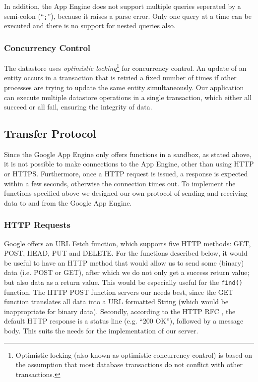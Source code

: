 In addition, the App Engine does not support multiple queries seperated by a
semi-colon (``\texttt{;}''), because it raises a parse error. Only one query at
a time can be executed and there is no support for nested queries also.

\subsubsection{Concurrency Control}
\label{serverdesign-transactions}
The datastore uses \emph{optimistic locking}\footnote{Optimistic locking (also
known as optimistic concurrency control) is based on the assumption that most
database transactions do not conflict with other transactions.} for concurrency
control. An update of an entity occurs in a transaction that is retried a fixed
number of times if other processes are trying to update the same entity
simultaneously. Our application can execute multiple datastore operations in a
single transaction, which either all succeed or all fail, ensuring the integrity
of data. 

\subsection{Transfer Protocol}
\label{serverdesign-transfer-protocol}
Since the Google App Engine only offers functions in a sandbox, as stated above,
it is not possible to make connections to the App Engine, other than using HTTP
or HTTPS. Furthermore, once a HTTP request is issued, a response is expected within
a few seconds, otherwise the connection times out. To implement the functions
specified above we designed our own protocol of sending and receiving data to
and from the Google App Engine.

\subsubsection{HTTP Requests}
Google offers an URL Fetch function, which supports five HTTP methods: GET, POST,
HEAD, PUT and DELETE. For the functions described below, it would be useful to
have an HTTP method that would allow us to send some (binary) data (i.e. POST or
GET), after which we do not only get a success return value; but also data as a
return value. This would be especially useful for the \texttt{find()} function.
The HTTP POST function servers our needs best, since the GET function translates
all data into a URL formatted String (which would be inappropriate for binary
data). Secondly, according to the HTTP RFC , the default HTTP response is a
status line (e.g. ``200 OK''), followed by a message body. This suits the needs
for the implementation of our server.

